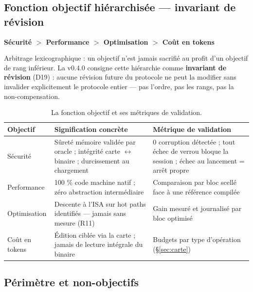 \subsection{Fonction objectif hiérarchisée — invariant de révision}\label{sec:objectif}

\begin{center}
\large\bfseries Sécurité $>$ Performance $>$ Optimisation $>$ Coût en tokens
\end{center}

\medskip

Arbitrage lexicographique : un objectif n’est jamais sacrifié au profit d’un objectif de
rang inférieur. La v0.4.0 consigne cette hiérarchie comme \textbf{invariant de révision}
(D19) : aucune révision future du protocole ne peut la modifier sans invalider
explicitement le protocole entier — pas l’ordre, pas les rangs, pas la non-compensation.

\begin{table}[htbp]
\centering\small
\caption{La fonction objectif et ses métriques de validation.}
\label{tab:objectif}
\begin{tabularx}{\textwidth}{@{}l Y Y@{}}
\toprule
\textbf{Objectif} & \textbf{Signification concrète} & \textbf{Métrique de validation} \\
\midrule
Sécurité & Sûreté mémoire validée par oracle ; intégrité carte $\leftrightarrow$ binaire ;
durcissement au chargement & 0 corruption détectée ; tout échec de verrou bloque la
session ; échec au lancement = arrêt propre \\
Performance & 100 \% code machine natif ; zéro abstraction intermédiaire &
Comparaison par bloc scellé face à une référence compilée \\
Optimisation & Descente à l’ISA sur hot paths identifiés — jamais sans mesure (R11) &
Gain mesuré et journalisé par bloc optimisé \\
Coût en tokens & Édition ciblée via la carte ; jamais de lecture intégrale du binaire &
Budgets par type d’opération (§\ref{sec:carte}) \\
\bottomrule
\end{tabularx}
\end{table}

\subsection{Périmètre et non-objectifs}\label{sec:perimetre}

